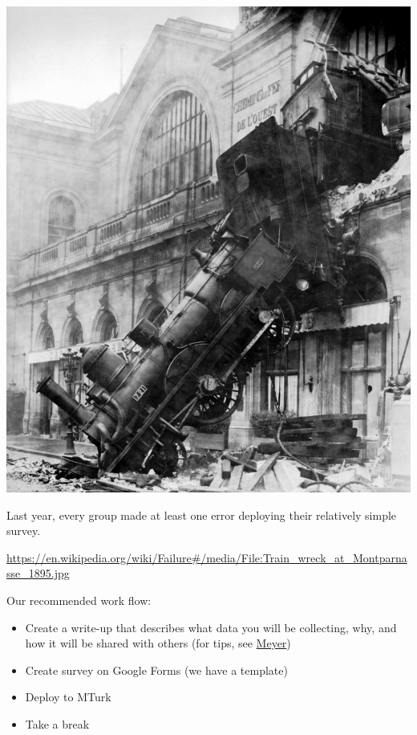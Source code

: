 \documentclass[aspectratio=169]{beamer}
\begin{document}
\begin{frame}

\begin{center}
\includegraphics[height=0.6\textheight]{figures/Train_wreck_at_Montparnasse_1895.jpg}
\end{center}

Last year, every group made at least one error deploying their relatively simple survey.

\vfill

{\tiny \url{https://en.wikipedia.org/wiki/Failure\#/media/File:Train_wreck_at_Montparnasse_1895.jpg}}
\end{frame}
\begin{frame}

Our recommended work flow:
\begin{itemize}
\item Create a write-up that describes what data you will be collecting, why, and how it will be shared with others (for tips, see \href{https://doi.org/10.1177/2515245917747656}{Meyer})
\item Create survey on Google Forms (we have a template)
\item Deploy to MTurk
\pause
\item Take a break
\end{itemize}

\end{frame}
\end{document}
